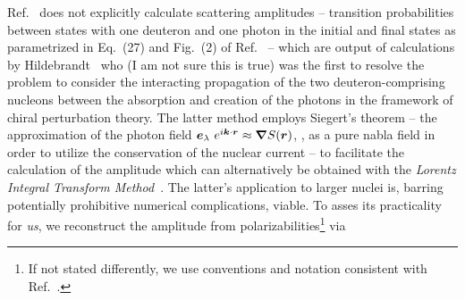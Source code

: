 Ref.~\cite{Bampa:2011fq} does not explicitly calculate scattering amplitudes -- transition probabilities
between states with one deuteron and one photon in the initial and final states as parametrized
in Eq.~(27) and Fig.~(2) of Ref.~\cite{Bampa:2011fq} -- which are output of calculations
by Hildebrandt~\cite{Hildebrandt:2005ix} who (I am not sure this is true) was the first to resolve
the problem to consider the interacting propagation of the two deuteron-comprising nucleons between
the absorption and creation of the photons in the framework of chiral perturbation theory.
The latter method employs Siegert's theorem -- the approximation of the photon field 
$\boldsymbol{e}_\lambda~e^{i\boldsymbol{k}\cdot\boldsymbol{r}}\approx\boldsymbol{\nabla}S(\boldsymbol{r})$, \ie, 
as a pure nabla field in order to utilize the conservation of the nuclear current -- to facilitate
the calculation of the amplitude which can alternatively be obtained with the {\it Lorentz Integral
Transform Method}~\cite{0954-3899-34-12-R02}. The latter's application to larger nuclei is, barring
potentially prohibitive numerical complications, viable. To asses its practicality for {\it us},
we reconstruct the amplitude from polarizabilities\footnote{If not stated differently, we use conventions
and notation consistent with Ref.~\cite{Bampa:2011fq}.} via

